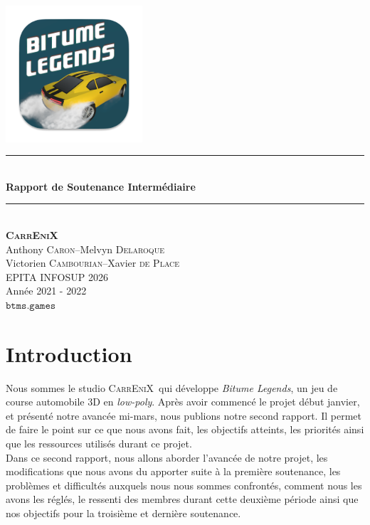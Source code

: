 \documentclass[12pt,a4paper]{article}
\newcommand{\btmlgs}{\textsl{Bitume Legends}}
\newcommand{\CEX}{\textsc{CarrEniX}}
\newcommand{\SITE}{\(\mathtt{btms.games}\)}
\begin{document}
    \begin{titlepage}
        \newcommand{\HRule}{\rule{\linewidth}{0.5mm}}
        \center
        \text{\LARGE Projet \btmlgs}\\[1cm]
        \includegraphics[scale=0.7]{logo192.png} \\[1cm]
        \HRule \\[0.4cm]
        { \huge \bfseries Rapport de Soutenance Intermédiaire\\[0.3cm] }
        \HRule \\[1.5cm]
        {\large \bfseries \CEX} \\[0.3cm]
        Anthony \textsc{Caron}\;--\;Melvyn \textsc{Delaroque}\\
        Victorien \textsc{Cambourian}\;--\;Xavier \textsc{de Place}
        \\ [4.5cm]
        EPITA INFOSUP 2026\\Année 2021 - 2022\\
        \SITE
    \end{titlepage}

    \tableofcontents
    \clearpage

    \section*{Introduction}
        Nous sommes le studio \CEX\, qui développe \btmlgs, un jeu de course automobile 3D en
        \textit{low-poly}. Après avoir commencé le projet début janvier, et présenté notre avancée 
        mi-mars, nous publions notre second rapport. Il permet de faire le point sur ce que nous avons
        fait, les objectifs atteints, les priorités ainsi que les ressources utilisés durant ce 
        projet.\\
        Dans ce second rapport, nous allons aborder l'avancée de notre projet, les modifications que 
        nous avons du apporter suite à la première soutenance, les problèmes et difficultés auxquels 
        nous nous sommes confrontés, comment nous les avons les réglés, le ressenti des membres durant 
        cette deuxième période ainsi que nos objectifs pour la troisième et dernière soutenance.
\end{document}
